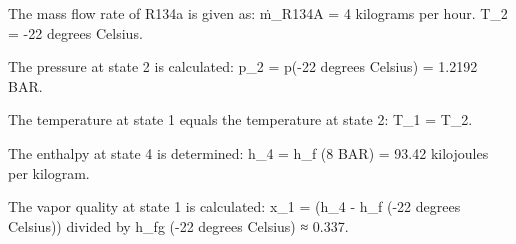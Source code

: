 The mass flow rate of R134a is given as:  
ṁ_R134A = 4 kilograms per hour.  
T_2 = -22 degrees Celsius.  

The pressure at state 2 is calculated:  
p_2 = p(-22 degrees Celsius) = 1.2192 BAR.  

The temperature at state 1 equals the temperature at state 2:  
T_1 = T_2.  

The enthalpy at state 4 is determined:  
h_4 = h_f (8 BAR) = 93.42 kilojoules per kilogram.  

The vapor quality at state 1 is calculated:  
x_1 = (h_4 - h_f (-22 degrees Celsius)) divided by h_fg (-22 degrees Celsius) ≈ 0.337.